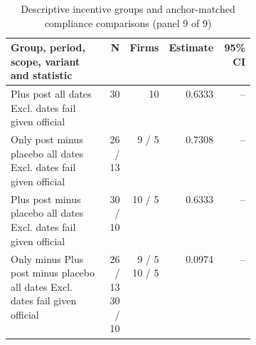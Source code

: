 \begin{table}[!htbp]\centering\scriptsize
\caption{Descriptive incentive groups and anchor-matched compliance comparisons (panel 9 of 9)}
\begin{threeparttable}
\begin{tabular}{p{0.40\linewidth}rrrr}
\toprule
Group, period, scope, variant and statistic & N & Firms & Estimate & 95\% CI \\
\midrule
Plus post all dates Excl. dates fail given official & 30 & 10 & 0.6333 & -- \\
Only post minus placebo all dates Excl. dates fail given official & 26 / 13 & 9 / 5 & 0.7308 & -- \\
Plus post minus placebo all dates Excl. dates fail given official & 30 / 10 & 10 / 5 & 0.6333 & -- \\
Only minus Plus post minus placebo all dates Excl. dates fail given official & \shortstack{26 / 13\\30 / 10} & \shortstack{9 / 5\\10 / 5} & 0.0974 & -- \\
\bottomrule
\end{tabular}
\begin{tablenotes}[flushleft]\footnotesize

\end{tablenotes}
\end{threeparttable}
\end{table}
